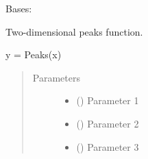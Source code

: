 \documentclass[letterpaper,10pt,english,openany,oneside]{sphinxmanual}
\begin{document}
\begin{fulllineitems}
\label{\detokenize{pygpc.testfunctions:pygpc.testfunctions.testfunctions.Peaks}}
Bases: {\hyperref[\detokenize{pygpc:pygpc.AbstractModel.AbstractModel}]{}}

Two-dimensional peaks function.

y = Peaks(x)
\begin{quote}\begin{description}
\item[{Parameters}] \leavevmode\begin{itemize}
\item {} 
\sphinxstyleliteralstrong{\sphinxupquote{{[}}}\sphinxstyleliteralstrong{\sphinxupquote{{]}}} (\sphinxstyleliteralemphasis{\sphinxupquote{ {[}}}\sphinxstyleliteralemphasis{\sphinxupquote{{]}}}) \textendash{} Parameter 1

\item {} 
\sphinxstyleliteralstrong{\sphinxupquote{{[}}}\sphinxstyleliteralstrong{\sphinxupquote{{]}}} (\sphinxstyleliteralemphasis{\sphinxupquote{ {[}}}\sphinxstyleliteralemphasis{\sphinxupquote{{]}}}) \textendash{} Parameter 2

\item {} 
\sphinxstyleliteralstrong{\sphinxupquote{{[}}}\sphinxstyleliteralstrong{\sphinxupquote{{]}}} (\sphinxstyleliteralemphasis{\sphinxupquote{ {[}}}\sphinxstyleliteralemphasis{\sphinxupquote{{]}}}) \textendash{} Parameter 3


\end{itemize}
\end{description}
\end{quote}
\end{fulllineitems}
\end{document}
